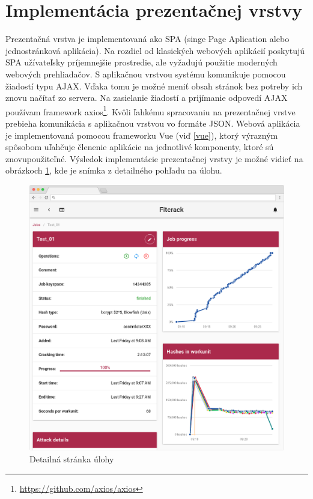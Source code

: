 \documentclass[slovak]{fitthesis}
\begin{document}
\section{Implementácia prezentačnej vrstvy}


Prezentačná vrstva je implementovaná ako SPA (singe Page Aplication alebo jednostránková aplikácia). Na rozdiel od klasických webových aplikácií poskytujú SPA užívateľsky príjemnejšie prostredie, ale vyžadujú použitie moderných webových prehliadačov. S aplikačnou vrstvou systému komunikuje pomocou žiadostí typu AJAX. Vďaka tomu je možné meniť obsah stránok bez potreby ich znovu načítať zo servera. Na zasielanie žiadostí a prijímanie odpovedí AJAX používam framework axios\footnote{\url{https://github.com/axios/axios}}. Kvôli ľahkému spracovaniu na prezentačnej vrstve prebieha komunikácia s aplikačnou vrstvou vo formáte JSON. Webová aplikácia je implementovaná pomocou frameworku Vue (viď \ref{vue}), ktorý výrazným spôsobom uľahčuje členenie aplikácie na jednotlivé komponenty, ktoré sú znovupoužiteľné. Výsledok implementácie prezentačnej vrstvy je možné vidieť na obrázkoch \ref{fig:detailPage}, kde je snímka z detailného pohľadu na úlohu.
\begin{figure}[H]
    \centering
    \includegraphics[scale=0.25]{obrazky/jobDetail2Frame.PNG}
    \caption{Detailná stránka úlohy}
    \label{fig:detailPage}
\end{figure}
\end{document}
